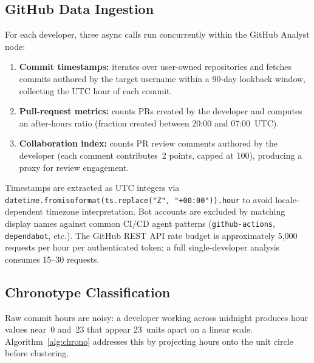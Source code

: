 \documentclass[conference]{IEEEtran}
\begin{document}
\subsection{GitHub Data Ingestion}

For each developer, three async calls run concurrently within the
GitHub Analyst node:

\begin{enumerate}
  \item \textbf{Commit timestamps:} iterates over user-owned
    repositories and fetches commits authored by the target
    username within a 90-day lookback window, collecting the
    UTC hour of each commit.
  \item \textbf{Pull-request metrics:} counts PRs created by
    the developer and computes an after-hours ratio
    (fraction created between 20:00 and 07:00~UTC).
  \item \textbf{Collaboration index:} counts PR review comments
    authored by the developer (each comment contributes~2 points,
    capped at 100), producing a proxy for review engagement.
\end{enumerate}

Timestamps are extracted as UTC integers via
\texttt{datetime.fromisoformat(ts.replace("Z", "+00:00")).hour}
to avoid locale-dependent timezone interpretation.  Bot accounts
are excluded by matching display names against common CI/CD agent
patterns (\texttt{github-actions}, \texttt{dependabot}, etc.).
The GitHub REST API rate budget is approximately 5,000 requests
per hour per authenticated token; a full single-developer analysis
consumes 15--30 requests.

\subsection{Chronotype Classification}

Raw commit hours are noisy: a developer working across midnight
produces hour values near~0 and~23 that appear 23~units apart on a
linear scale.  Algorithm~\ref{alg:chrono} addresses this by
projecting hours onto the unit circle before clustering.
\end{document}
